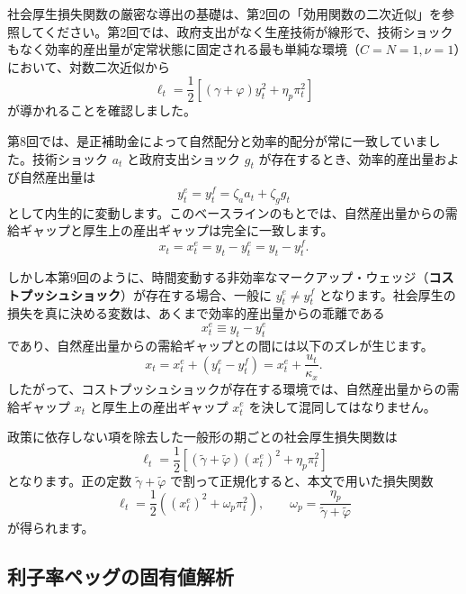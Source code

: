 \documentclass[
  japanese,
  lualatex,
  ja=standard,
  12pt,
  a4paper]{ltjsarticle}
\begin{document}
社会厚生損失関数の厳密な導出の基礎は、第2回の「効用関数の二次近似」を参照してください。第2回では、政府支出がなく生産技術が線形で、技術ショックもなく効率的産出量が定常状態に固定される最も単純な環境（\(C=N=1, \nu=1\)）において、対数二次近似から
\[
\ell_t
=
\frac{1}{2}
\left[
(\gamma+\varphi)y_t^2+\eta_p\pi_t^2
\right]
\] が導かれることを確認しました。

第8回では、是正補助金によって自然配分と効率的配分が常に一致していました。技術ショック
\(a_t\) と政府支出ショック \(g_t\)
が存在するとき、効率的産出量および自然産出量は \[
y_t^e=y_t^f=\zeta_a a_t+\zeta_g g_t
\]
として内生的に変動します。このベースラインのもとでは、自然産出量からの需給ギャップと厚生上の産出ギャップは完全に一致します。
\[
x_t=x_t^e=y_t-y_t^e=y_t-y_t^f.
\]

しかし本第9回のように、時間変動する非効率なマークアップ・ウェッジ（\textbf{コストプッシュショック}）が存在する場合、一般に
\(y_t^e \neq y_t^f\)
となります。社会厚生の損失を真に決める変数は、あくまで効率的産出量からの乖離である
\[
x_t^e \equiv y_t - y_t^e
\] であり、自然産出量からの需給ギャップとの間には以下のズレが生じます。
\[
x_t
=
x_t^e+(y_t^e-y_t^f)
=
x_t^e+\frac{u_t}{\kappa_x}.
\]
したがって、コストプッシュショックが存在する環境では、自然産出量からの需給ギャップ
\(x_t\) と厚生上の産出ギャップ \(x_t^e\) を決して混同してはなりません。

政策に依存しない項を除去した一般形の期ごとの社会厚生損失関数は \[
\ell_t
=
\frac{1}{2}
\left[
(\tilde{\gamma}+\tilde{\varphi})\left(x_t^e\right)^2
+\eta_p\pi_t^2
\right]
\] となります。正の定数 \(\tilde{\gamma}+\tilde{\varphi}\)
で割って正規化すると、本文で用いた損失関数 \[
\ell_t
=
\frac{1}{2}
\left(
\left(x_t^e\right)^2+\omega_p\pi_t^2
\right),
\qquad
\omega_p
=
\frac{\eta_p}{\tilde{\gamma}+\tilde{\varphi}}
\] が得られます。

\subsection{利子率ペッグの固有値解析}\label{ux5229ux5b50ux7387ux30daux30c3ux30b0ux306eux56faux6709ux5024ux89e3ux6790}
\end{document}
